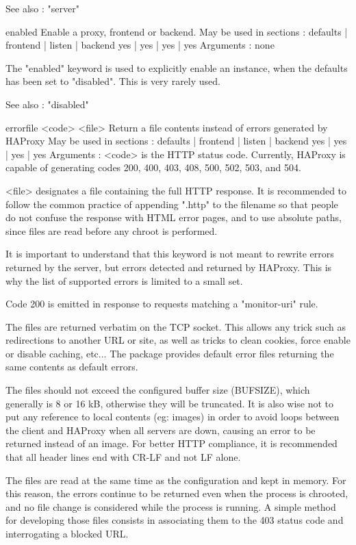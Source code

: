   See also : "server"


enabled
  Enable a proxy, frontend or backend.
  May be used in sections :   defaults | frontend | listen | backend
                                 yes   |    yes   |   yes  |   yes
  Arguments : none

  The "enabled" keyword is used to explicitly enable an instance, when the
  defaults has been set to "disabled". This is very rarely used.

  See also : "disabled"


errorfile <code> <file>
  Return a file contents instead of errors generated by HAProxy
  May be used in sections :   defaults | frontend | listen | backend
                                 yes   |    yes   |   yes  |   yes
  Arguments :
    <code>    is the HTTP status code. Currently, HAProxy is capable of
              generating codes 200, 400, 403, 408, 500, 502, 503, and 504.

    <file>    designates a file containing the full HTTP response. It is
              recommended to follow the common practice of appending ".http" to
              the filename so that people do not confuse the response with HTML
              error pages, and to use absolute paths, since files are read
              before any chroot is performed.

  It is important to understand that this keyword is not meant to rewrite
  errors returned by the server, but errors detected and returned by HAProxy.
  This is why the list of supported errors is limited to a small set.

  Code 200 is emitted in response to requests matching a "monitor-uri" rule.

  The files are returned verbatim on the TCP socket. This allows any trick such
  as redirections to another URL or site, as well as tricks to clean cookies,
  force enable or disable caching, etc... The package provides default error
  files returning the same contents as default errors.

  The files should not exceed the configured buffer size (BUFSIZE), which
  generally is 8 or 16 kB, otherwise they will be truncated. It is also wise
  not to put any reference to local contents (eg: images) in order to avoid
  loops between the client and HAProxy when all servers are down, causing an
  error to be returned instead of an image. For better HTTP compliance, it is
  recommended that all header lines end with CR-LF and not LF alone.

  The files are read at the same time as the configuration and kept in memory.
  For this reason, the errors continue to be returned even when the process is
  chrooted, and no file change is considered while the process is running. A
  simple method for developing those files consists in associating them to the
  403 status code and interrogating a blocked URL.

